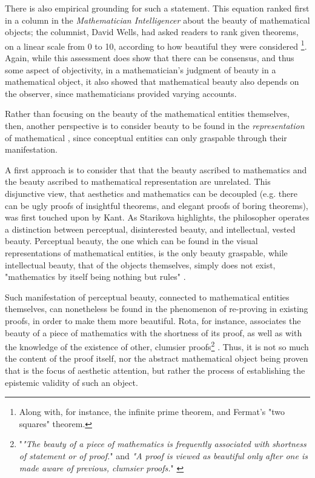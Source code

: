There is also empirical grounding for such a statement. This equation ranked first in a column in the \emph{Mathematician Intelligencer} about the beauty of mathematical objects; the columnist, David Wells, had asked readers to rank given theorems, on a linear scale from 0 to 10, according to how beautiful they were considered \citep{wells_are_1990}\footnote{Along with, for instance, the infinite prime theorem, and Fermat's "two squares" theorem.}. Again, while this assessment does show that there can be consensus, and thus some aspect of objectivity, in a mathematician's judgment of beauty in a mathematical object, it also showed that mathematical beauty also depends on the observer, since mathematicians provided varying accounts.

Rather than focusing on the beauty of the mathematical entities themselves, then, another perspective is to consider beauty to be found in the \emph{representation} of mathematical , since conceptual entities can only graspable through their manifestation.

A first approach is to consider that that the beauty ascribed to mathematics and the beauty ascribed to mathematical representation are unrelated. This disjunctive view, that aesthetics and mathematics can be decoupled (e.g. there can be ugly proofs of insightful theorems, and elegant proofs of boring theorems), was first touched upon by Kant. As Starikova highlights, the philosopher operates a distinction between perceptual, disinterested beauty, and intellectual, vested beauty. Perceptual beauty, the one which can be found in the visual representations of mathematical entities, is the only beauty graspable, while intellectual beauty, that of the objects themselves, simply does not exist, "mathematics by itself being nothing but rules" \citep{starikova_aesthetic_2018}.

Such manifestation of perceptual beauty, connected to mathematical entities themselves, can nonetheless be found in the phenomenon of re-proving in existing proofs, in order to make them more beautiful. Rota, for instance, associates the beauty of a piece of mathematics with the shortness of its proof, as well as with the knowledge of the existence of other, clumsier proofs\footnote{"\emph{"The beauty of a piece of mathematics is frequently associated with shortness of statement or of proof.}" and \emph{"A proof is viewed as beautiful only after one is made aware of previous, clumsier proofs.}" \citep{rota_phenomenology_1997}} \citep{rota_phenomenology_1997}. Thus, it is not so much the content of the proof itself, nor the abstract mathematical object being proven that is the focus of aesthetic attention, but rather the process of establishing the epistemic validity of such an object.

